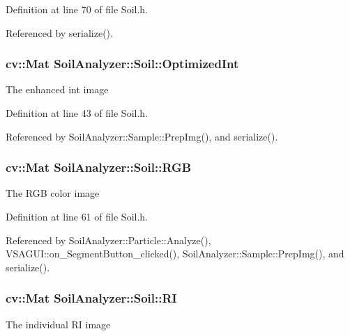 Definition at line 70 of file Soil.\+h.



Referenced by serialize().

\hypertarget{class_soil_analyzer_1_1_soil_a27f7c15f63cbf64c07ceedb30c25e861}{}
\subsubsection[{Optimized\+Int}]{\setlength{\rightskip}{0pt plus 5cm}cv\+::\+Mat Soil\+Analyzer\+::\+Soil\+::\+Optimized\+Int\hspace{0.3cm}{\ttfamily [protected]}}\label{class_soil_analyzer_1_1_soil_a27f7c15f63cbf64c07ceedb30c25e861}
The enhanced int image 

Definition at line 43 of file Soil.\+h.



Referenced by Soil\+Analyzer\+::\+Sample\+::\+Prep\+Img(), and serialize().

\hypertarget{class_soil_analyzer_1_1_soil_a4a328e0ebe7f1f3c5a1c4c581180d19e}{}
\subsubsection[{R\+G\+B}]{\setlength{\rightskip}{0pt plus 5cm}cv\+::\+Mat Soil\+Analyzer\+::\+Soil\+::\+R\+G\+B}\label{class_soil_analyzer_1_1_soil_a4a328e0ebe7f1f3c5a1c4c581180d19e}
The R\+G\+B color image 

Definition at line 61 of file Soil.\+h.



Referenced by Soil\+Analyzer\+::\+Particle\+::\+Analyze(), V\+S\+A\+G\+U\+I\+::on\+\_\+\+Segment\+Button\+\_\+clicked(), Soil\+Analyzer\+::\+Sample\+::\+Prep\+Img(), and serialize().

\hypertarget{class_soil_analyzer_1_1_soil_abe8693b60a3d88433ffb8255b8d260c3}{}
\subsubsection[{R\+I}]{\setlength{\rightskip}{0pt plus 5cm}cv\+::\+Mat Soil\+Analyzer\+::\+Soil\+::\+R\+I}\label{class_soil_analyzer_1_1_soil_abe8693b60a3d88433ffb8255b8d260c3}
The individual R\+I image 

